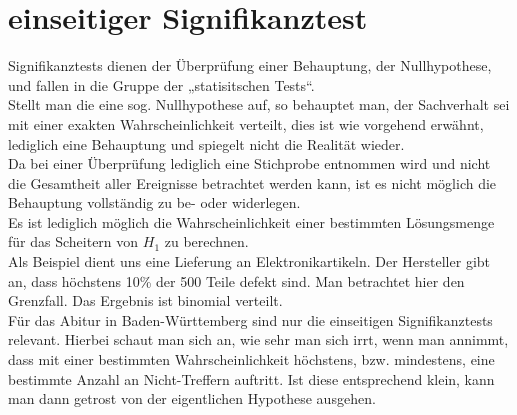 \section{einseitiger Signifikanztest}
Signifikanztests dienen der Überprüfung einer Behauptung, der Nullhypothese, und fallen in die Gruppe der „statisitschen Tests“.\\
Stellt man die eine sog. Nullhypothese auf, so behauptet man, der Sachverhalt sei mit einer exakten Wahrscheinlichkeit verteilt, dies ist wie vorgehend erwähnt, lediglich eine Behauptung und spiegelt nicht die Realität wieder.\\
Da bei einer Überprüfung lediglich eine Stichprobe entnommen wird und nicht die Gesamtheit aller Ereignisse betrachtet werden kann, ist es nicht möglich die Behauptung vollständig zu be- oder widerlegen.\\
Es ist lediglich möglich die Wahrscheinlichkeit einer bestimmten Lösungsmenge für das Scheitern von $H_1$ zu berechnen.\\
Als Beispiel dient uns eine Lieferung an Elektronikartikeln. Der Hersteller gibt an, dass höchstens 10\% der 500 Teile defekt sind. Man betrachtet hier den Grenzfall. Das Ergebnis ist binomial verteilt.\\
Für das Abitur in Baden-Württemberg sind nur die einseitigen Signifikanztests relevant.
Hierbei schaut man sich an, wie sehr man sich irrt, wenn man annimmt, dass mit einer bestimmten Wahrscheinlichkeit höchstens, bzw. mindestens, eine bestimmte Anzahl an Nicht-Treffern auftritt. Ist diese entsprechend klein, kann man dann getrost von der eigentlichen Hypothese ausgehen.







 